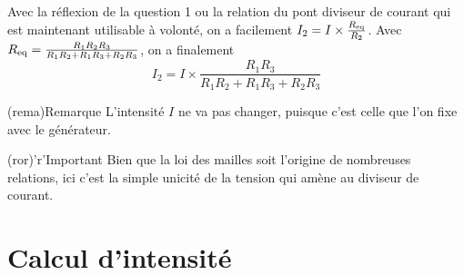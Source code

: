 \documentclass[../../main/main.tex]{subfiles}
\begin{document}
{\begin{tcbraster}[raster columns=7, raster equal height=rows]
\begin{tcb}[raster multicolumn=3]
        Avec la réflexion de la question 1 ou la relation du pont diviseur de
        courant qui est maintenant utilisable à volonté, on a facilement $I_2 =
        I\times \frac{R_{\rm eq}}{R_2}$. Avec $R_{\rm eq} =
        \frac{R_1R_2R_3}{R_1R_2+R_1R_3+R_2R_3}$, on a finalement
        \[\boxed{I_2 = I \times \frac{R_1R_3}{R_1R_2+R_1R_3+R_2R_3}}\]
    \end{tcb}
\end{tcbraster}
\begin{tcbraster}[raster columns=2, raster equal height=rows]
    \begin{tcb}(rema){Remarque}
        L'intensité $I$ ne va pas changer, puisque c'est celle que l'on fixe
        avec le générateur.
    \end{tcb}
    \begin{tcb}(ror)'r'{Important}
        Bien que la loi des mailles soit l'origine de nombreuses relations, ici
        c'est la simple unicité de la tension qui amène au diviseur de courant.
    \end{tcb}
\end{tcbraster}
}

\section{Calcul d'intensité}
\end{document}
